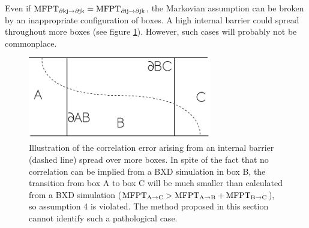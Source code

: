 Even if ${\rm MFPT}_{\rm \partial kj \rightarrow \partial jk} = {\rm MFPT}_{\rm \partial ij \rightarrow \partial jk}$, the Markovian assumption can be broken by an inappropriate configuration of boxes. 
A high internal barrier could spread throughout more boxes (see figure \ref{fig:bar-3-boxy}). 
However, such cases will probably not be commonplace.
\begin{figure}[h]
\centering
\includegraphics[width=8cm]{Images/manyboxcorrelation.pdf}
\caption[Multi-box correlation]{Illustration of the correlation error arising from an internal barrier (dashed line) spread over more boxes. In spite of the fact that no correlation can be implied from a BXD simulation in box B, the transition from box A to box C will be much smaller than calculated from a BXD simulation ($\rm MFPT_{A \rightarrow C} > MFPT_{A \rightarrow B} + MFPT_{B \rightarrow C}$), so assumption 4 is violated. The method proposed in this section cannot identify such a pathological case.}
\label{fig:bar-3-boxy}
\end{figure}


